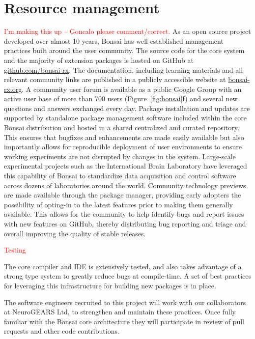 \section{Resource management}
\textcolor{red}{I'm making this up -- Goncalo please comment/correct.}
%
As an open source project developed over almost 10 years, Bonsai 
has well-established management practices built around the user community.
%
The source code for the core system and the majority of extension packages
is hosted on GitHub at \url{github.com/bonsai-rx}.
%
The documentation, including learning materials and all relevant community
links are published in a publicly accessible website at \url{bonsai-rx.org}.
%
A community user forum is available as a public Google Group with an active
user base of more than 700 users (Figure~\ref{fig:bonsai}f) and several
new questions and answers exchanged every day.
%
Package installation and updates are supported by standalone package
management software included within the core Bonsai distribution and hosted
in a shared centralized and curated repository.
%
This ensures that bugfixes and enhancements are made easily available but
also importantly allows for reproducible deployment of user environments
to ensure working experiments are not disrupted by changes in the system.
Large-scale experimental projects such as the International Brain Laboratory
have leveraged this capability of Bonsai to standardize data acquisition and
control software across dozens of laboratories around the world.
%
Community technology previews are made available through the package manager,
providing early adopters the possibility of opting-in to the latest features
prior to making them generally available. This allows for the community
to help identify bugs and report issues with new features on GitHub, thereby
distributing bug reporting and triage and overall improving the quality of
stable releases.

\textcolor{red}{Testing}

The core compiler and IDE is extensively tested, and also takes advantage of
a strong type system to greatly reduce bugs at compile-time. A set of best
practices for leveraging this infrastructure for building new packages is
in place.

The software engineers recruited to this project will work with our
collaborators at NeuroGEARS Ltd, to strengthen and maintain these
practices.  Once fully familiar with the Bonsai core architecture they
will participate in review of pull requests and other code contributions.

